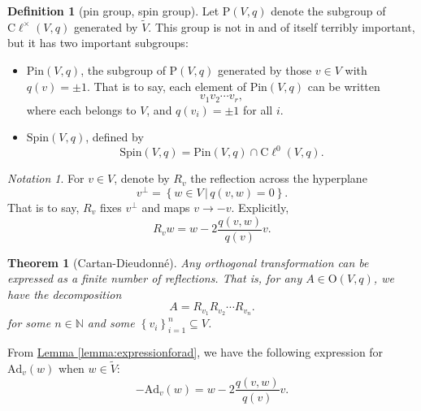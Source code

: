 \documentclass[a4paper]{report}
\newcommand{\N}{\mathbb{N}}
\newcommand{\defn}[1]{\ul{#1}}
\newcommand{\cliff}{\mathrm{C}\ell}
\newcommand{\Ad}{\mathrm{Ad}}
\newcommand{\Pin}{\mathrm{Pin}}
\newcommand{\Spin}{\mathrm{Spin}}
\newcommand{\Or}{\mathrm{O}}
\theoremstyle{definition}
\newtheorem{definition}{Definition}[section]
\theoremstyle{plain}
\newtheorem{theorem}{Theorem}[section]
\theoremstyle{remark}
\newtheorem{notation}{Notation}[section]
\begin{document}
\begin{definition}[pin group, spin group]
  \label{def:pinspingroup}
  Let $\mathrm{P}(V, q)$ denote the subgroup of $\cliff^{\times}(V, q)$ generated by $\tilde{V}$. This group is not in and of itself terribly important, but it has two important subgroups:
  \begin{itemize}
    \item \defn{$\Pin(V, q)$}, the subgroup of $\mathrm{P}(V, q)$ generated by those $v \in V$ with $q(v) = \pm 1$. That is to say, each element of $\Pin(V, q)$ can be written
      \begin{equation*}
        v_{1}v_{2}\cdots v_{r},
      \end{equation*}
      where each belongs to $V$, and $q(v_{i}) = \pm 1$ for all $i$.

    \item \defn{$\Spin(V, q)$}, defined by 
      \begin{equation*}
        \Spin(V, q) = \Pin(V, q) \cap \cliff^{0}(V, q).
      \end{equation*}
  \end{itemize}
\end{definition}

\begin{notation}
  For $v \in V$, denote by $R_{v}$ the reflection across the hyperplane 
  \begin{equation*}
    v^{\perp} = \left\{ w \in V\,\big|\, q(v, w) = 0 \right\}.
  \end{equation*}
  That is to say, $R_{v}$ fixes $v^{\perp}$ and maps $v \to -v$. Explicitly, 
  \begin{equation*}
    R_{v} w = w - 2\frac{q(v, w)}{q(v)} v.
  \end{equation*}
\end{notation}

\begin{theorem}[Cartan-Dieudonn{\'e}]
  \label{thm:cartandieudonne}
  Any orthogonal transformation can be expressed as a finite number of reflections. That is, for any $A \in \Or(V, q)$, we have the decomposition
  \begin{equation*}
    A = R_{v_{1}} R_{v_{2}} \cdots R_{v_{n}}.
  \end{equation*}
  for some $n \in \N$ and some $\left\{ v_{i} \right\}_{i=1}^{n} \subseteq V$.
\end{theorem}

From \hyperref[lemma:expressionforad]{Lemma \ref*{lemma:expressionforad}}, we have the following expression for $\Ad_{v}(w)$ when $w \in \tilde{V}$:
\begin{equation*}
  -\Ad_{v}(w) = w - 2\frac{q(v, w)}{q(v)}v.
\end{equation*}
\end{document}
